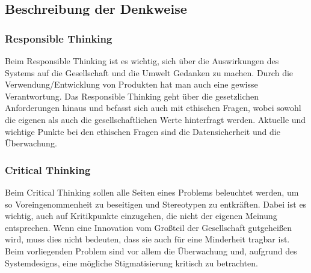 
\subsection{Beschreibung der Denkweise}
\subsubsection{\textbf{Responsible Thinking}}  
Beim Responsible Thinking ist es wichtig, sich über die Auswirkungen des Systems auf die Gesellschaft und die Umwelt Gedanken zu machen. Durch die Verwendung/Entwicklung von Produkten hat man auch eine gewisse Verantwortung. Das Responsible Thinking geht über die gesetzlichen Anforderungen hinaus und befasst sich auch mit ethischen Fragen, wobei sowohl die eigenen als auch die gesellschaftlichen Werte hinterfragt werden. Aktuelle und wichtige Punkte bei den ethischen Fragen sind die Datensicherheit und die Überwachung. 
\\
\subsubsection{\textbf{Critical Thinking}}  
Beim Critical Thinking sollen alle Seiten eines Problems beleuchtet werden, um so Voreingenommenheit zu beseitigen und Stereotypen zu entkräften. Dabei ist es wichtig, auch auf Kritikpunkte einzugehen, die nicht der eigenen Meinung entsprechen. Wenn eine Innovation vom Großteil der Gesellschaft gutgeheißen wird, muss dies nicht bedeuten, dass sie auch für eine Minderheit tragbar ist. Beim vorliegenden Problem sind vor allem die Überwachung und, aufgrund des Systemdesigns, eine mögliche Stigmatisierung kritisch zu betrachten. 

